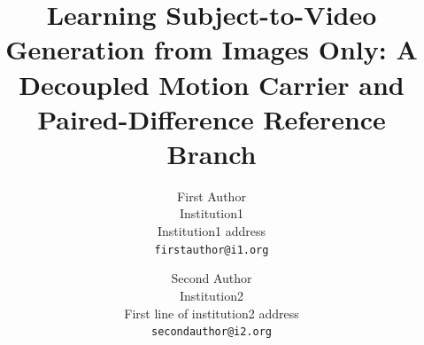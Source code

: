\documentclass[10pt,twocolumn,letterpaper]{article}
\title{Learning Subject-to-Video Generation from Images Only: A Decoupled Motion Carrier and Paired-Difference Reference Branch}
\author{First Author\\
Institution1\\
Institution1 address\\
{\tt\small firstauthor@i1.org}
\and
Second Author\\
Institution2\\
First line of institution2 address\\
{\tt\small secondauthor@i2.org}
}
\begin{document}
\maketitle
    




% 
% 
{
    \small
    
    
}

% 
\end{document}
